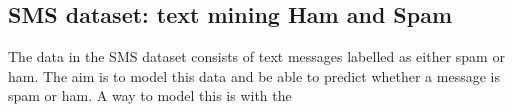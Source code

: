 \documentclass{llncs}
\begin{document}
\subsection{SMS dataset: text mining Ham and Spam}
The data in the SMS dataset consists of text messages labelled as either spam or ham. The aim is to model this data and be able to predict whether a message is spam or ham. A way to model this is with the            


\end{document}
